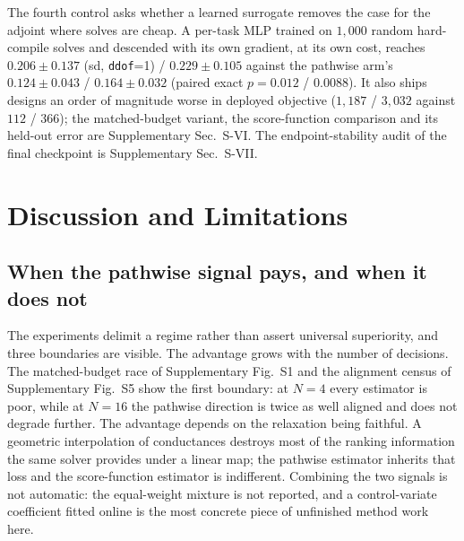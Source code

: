 \documentclass[journal]{IEEEtran}
\begin{document}
The fourth control asks whether a learned surrogate removes the case for the adjoint
where solves are cheap.  A per-task MLP trained on $1{,}000$ random hard-compile solves
and descended with its own gradient, at its own cost, reaches $0.206\pm0.137$ (sd, \texttt{ddof}=1) /
$0.229\pm0.105$ against the pathwise arm's $0.124\pm0.043$ / $0.164\pm0.032$ (paired
exact $p=0.012$ / $0.0088$).  It also ships designs an order of magnitude worse in
deployed objective ($1{,}187$ / $3{,}032$ against $112$ / $366$); the matched-budget
variant, the score-function comparison and its held-out error are Supplementary Sec.~S-VI.
The endpoint-stability audit of the final checkpoint is Supplementary Sec.~S-VII.

\section{Discussion and Limitations}
\label{sec:discussion}
\subsection{When the pathwise signal pays, and when it does not}
The experiments delimit a regime rather than assert universal superiority, and
three boundaries are visible.  The advantage grows with the number of decisions.  The matched-budget race of
Supplementary Fig.~S1 and the alignment census of Supplementary Fig.~S5 show the
first boundary: at $N=4$ every estimator is poor, while at $N=16$ the pathwise
direction is twice as well aligned and does not degrade further.  The advantage depends on the relaxation being faithful.  A geometric interpolation
of conductances destroys most of the ranking information the same solver
provides under a linear map; the pathwise estimator inherits that loss and the
score-function estimator is indifferent.  Combining the two signals is not
automatic: the equal-weight mixture is not reported, and a
control-variate coefficient fitted online is the most concrete piece of
unfinished method work here.
\end{document}
